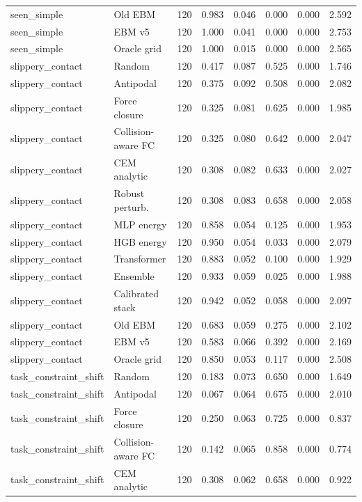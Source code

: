 {\begin{longtable}{llrrrrrr}
seen\_simple & Old EBM & 120 & 0.983 & 0.046 & 0.000 & 0.000 & 2.592 \\
seen\_simple & EBM v5 & 120 & 1.000 & 0.041 & 0.000 & 0.000 & 2.753 \\
seen\_simple & Oracle grid & 120 & 1.000 & 0.015 & 0.000 & 0.000 & 2.565 \\
slippery\_contact & Random & 120 & 0.417 & 0.087 & 0.525 & 0.000 & 1.746 \\
slippery\_contact & Antipodal & 120 & 0.375 & 0.092 & 0.508 & 0.000 & 2.082 \\
slippery\_contact & Force closure & 120 & 0.325 & 0.081 & 0.625 & 0.000 & 1.985 \\
slippery\_contact & Collision-aware FC & 120 & 0.325 & 0.080 & 0.642 & 0.000 & 2.047 \\
slippery\_contact & CEM analytic & 120 & 0.308 & 0.082 & 0.633 & 0.000 & 2.027 \\
slippery\_contact & Robust perturb. & 120 & 0.308 & 0.083 & 0.658 & 0.000 & 2.058 \\
slippery\_contact & MLP energy & 120 & 0.858 & 0.054 & 0.125 & 0.000 & 1.953 \\
slippery\_contact & HGB energy & 120 & 0.950 & 0.054 & 0.033 & 0.000 & 2.079 \\
slippery\_contact & Transformer & 120 & 0.883 & 0.052 & 0.100 & 0.000 & 1.929 \\
slippery\_contact & Ensemble & 120 & 0.933 & 0.059 & 0.025 & 0.000 & 1.988 \\
slippery\_contact & Calibrated stack & 120 & 0.942 & 0.052 & 0.058 & 0.000 & 2.097 \\
slippery\_contact & Old EBM & 120 & 0.683 & 0.059 & 0.275 & 0.000 & 2.102 \\
slippery\_contact & EBM v5 & 120 & 0.583 & 0.066 & 0.392 & 0.000 & 2.169 \\
slippery\_contact & Oracle grid & 120 & 0.850 & 0.053 & 0.117 & 0.000 & 2.508 \\
task\_constraint\_shift & Random & 120 & 0.183 & 0.073 & 0.650 & 0.000 & 1.649 \\
task\_constraint\_shift & Antipodal & 120 & 0.067 & 0.064 & 0.675 & 0.000 & 2.010 \\
task\_constraint\_shift & Force closure & 120 & 0.250 & 0.063 & 0.725 & 0.000 & 0.837 \\
task\_constraint\_shift & Collision-aware FC & 120 & 0.142 & 0.065 & 0.858 & 0.000 & 0.774 \\
task\_constraint\_shift & CEM analytic & 120 & 0.308 & 0.062 & 0.658 & 0.000 & 0.922 \\

\end{longtable}}
